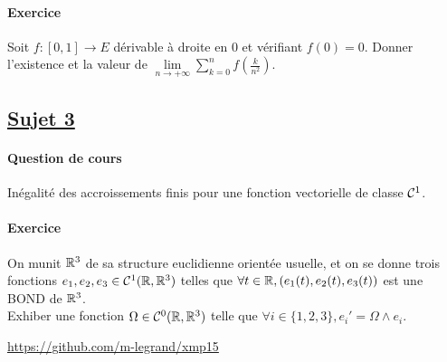\documentclass[12pt,a4paper]{report}
\begin{document}
\paragraph*{Exercice}
Soit $f : [0,1] \rightarrow E$ dérivable à droite en $0$ et vérifiant $f(0)=0$. Donner l'existence et la valeur de 
$\lim\limits_{n\rightarrow +\infty}\sum\limits_{k=0}^nf\left(\frac{k}{n^2}\right).$

\subsection*{\underline{Sujet 3}}

\paragraph*{Question de cours}
Inégalité des accroissements finis pour une fonction vectorielle de classe $\mathcal{C}^1$.

\paragraph*{Exercice}
On munit $\mathbb{R}^3$ de sa structure euclidienne orientée usuelle, et on se donne trois fonctions $e_1, e_2, e_3 \in \mathcal{C}^1(\mathbb{R},\mathbb{R}^3)$ telles que $\forall t \in \mathbb{R}, (e_1(t), e_2(t), e_3(t))$ est une BOND de $\mathbb{R}^3$.\\
Exhiber une fonction $\Omega \in \mathcal{C}^0(\mathbb{R}, \mathbb{R}^3)$ telle que $\forall i\in \{1, 2, 3\}, e_i'=\Omega\wedge e_i$.

\vfill

\begin{center}
\url{https://github.com/m-legrand/xmp15}
\end{center}
\end{document}
